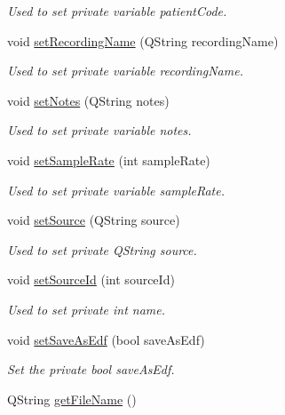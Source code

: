 \begin{DoxyCompactItemize}
\begin{DoxyCompactList}\small\item\em Used to set private variable patient\+Code. \end{DoxyCompactList}\item 
void \hyperlink{classSettingsSingleton_a015183461cfd8c90a1419341e09c7c92}{set\+Recording\+Name} (Q\+String recording\+Name)
\begin{DoxyCompactList}\small\item\em Used to set private variable recording\+Name. \end{DoxyCompactList}\item 
void \hyperlink{classSettingsSingleton_ac9c888265f360f1fe7ee3fb9441dd514}{set\+Notes} (Q\+String notes)
\begin{DoxyCompactList}\small\item\em Used to set private variable notes. \end{DoxyCompactList}\item 
void \hyperlink{classSettingsSingleton_afb6c1555d8a9a93fab574345b7e28e28}{set\+Sample\+Rate} (int sample\+Rate)
\begin{DoxyCompactList}\small\item\em Used to set private variable sample\+Rate. \end{DoxyCompactList}\item 
void \hyperlink{classSettingsSingleton_af3d750e4f32db65df430d03a9b947b16}{set\+Source} (Q\+String source)
\begin{DoxyCompactList}\small\item\em Used to set private Q\+String source. \end{DoxyCompactList}\item 
void \hyperlink{classSettingsSingleton_af4b9b4364b4146711000f425dd5f5aa9}{set\+Source\+Id} (int source\+Id)
\begin{DoxyCompactList}\small\item\em Used to set private int name. \end{DoxyCompactList}\item 
void \hyperlink{classSettingsSingleton_adb4221d2f742cff29038bfda74cfc784}{set\+Save\+As\+Edf} (bool save\+As\+Edf)
\begin{DoxyCompactList}\small\item\em Set the private bool save\+As\+Edf. \end{DoxyCompactList}\item 
Q\+String \hyperlink{classSettingsSingleton_aa5c7ee7b9966f8391d7431a7e8ab3949}{get\+File\+Name} ()

\end{DoxyCompactItemize}
